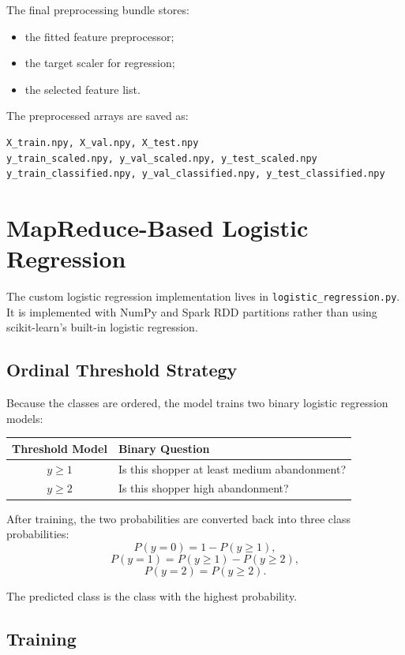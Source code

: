 \documentclass[11pt,a4paper]{article}
\begin{document}
The final preprocessing bundle stores:
\begin{itemize}
  \item the fitted feature preprocessor;
  \item the target scaler for regression;
  \item the selected feature list.
\end{itemize}

The preprocessed arrays are saved as:
\begin{verbatim}
X_train.npy, X_val.npy, X_test.npy
y_train_scaled.npy, y_val_scaled.npy, y_test_scaled.npy
y_train_classified.npy, y_val_classified.npy, y_test_classified.npy
\end{verbatim}

\section{MapReduce-Based Logistic Regression}

The custom logistic regression implementation lives in \texttt{logistic\_regression.py}. It is implemented with NumPy and Spark RDD partitions rather than using scikit-learn's built-in logistic regression.

\subsection{Ordinal Threshold Strategy}

Because the classes are ordered, the model trains two binary logistic regression models:
\begin{center}
\begin{tabular}{cl}
\toprule
Threshold Model & Binary Question \\
\midrule
$y \geq 1$ & Is this shopper at least medium abandonment? \\
$y \geq 2$ & Is this shopper high abandonment? \\
\bottomrule
\end{tabular}
\end{center}

After training, the two probabilities are converted back into three class probabilities:
\[
P(y=0) = 1 - P(y \geq 1),
\]
\[
P(y=1) = P(y \geq 1) - P(y \geq 2),
\]
\[
P(y=2) = P(y \geq 2).
\]

The predicted class is the class with the highest probability.

\subsection{Training}
\end{document}
